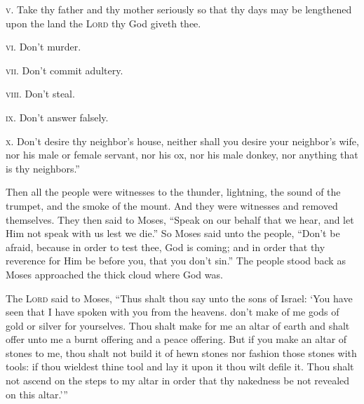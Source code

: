 \begin{inparaenum}
     \textsc{v.} Take thy father and thy mother seriously so that thy days may be lengthened upon the land the \textsc{Lord} thy God giveth thee.%
    
     \textsc{vi.} Don't murder.%
    
     \textsc{vii.} Don't commit adultery.%
    
     \textsc{viii.} Don't steal.%
    
     \textsc{ix.} Don't answer falsely.%
    
     \textsc{x.} Don't desire thy neighbor's house, neither shall you desire your neighbor's wife, nor his male or female servant, nor his ox, nor his male donkey, nor anything that is thy neighbors.''%
    
     Then all the people were witnesses to the thunder, lightning, the sound of the trumpet, and the smoke of the mount. And they were witnesses and removed themselves.%
     They then said to Moses, ``Speak on our behalf that we hear, and let Him not speak with us lest we die.''%
     So Moses said unto the people, ``Don't be afraid, because in order to test thee, God is coming; and in order that thy reverence for Him be before you, that you don't sin.''%
     The people stood back as Moses approached the thick cloud where God was.%
    
     The \textsc{Lord} said to Moses, ``Thus shalt thou say unto the sons of Israel: `You have seen that I have spoken with you from the heavens.%
     don't make of me gods of gold or silver for yourselves.%
     Thou shalt make for me an altar of earth and shalt offer unto me a burnt offering and a peace offering.%
     But if you make an altar of stones to me, thou shalt not build it of hewn stones nor fashion those stones with tools: if thou wieldest thine tool and lay it upon it thou wilt defile it.%
     Thou shalt not ascend on the steps to my altar in order that thy nakedness be not revealed on this altar.'\thinspace''%
\end{inparaenum}
